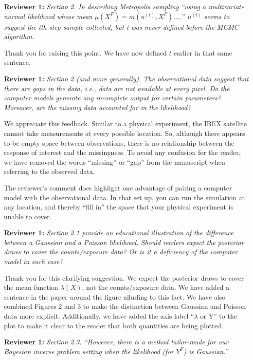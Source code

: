 \documentclass[12pt]{article}
\begin{document}
\bigskip
\noindent
\textbf{Reviewer 1:} \textit{Section 2. In describing Metropolis sampling
``using a multivariate normal likelihood whose mean} $\mu(X^F) = m(u^{(t)},
X^F) \ldots,$'' $u^{(t)}$ \textit{seems to suggest the tth step sample collected,
but t was never defined before the MCMC algorithm.}

\bigskip
\noindent
Thank you for raising this point. We have now defined $t$ earlier in that same
sentence.

\bigskip
\noindent
\textbf{Reviewer 1:} \textit{Section 2 (and more generally). The observational
data suggest that there are gaps in the data, i.e., data are not available at
every pixel. Do the computer models generate any incomplete output for certain
parameters? Moreover, are the missing data accounted for in the likelihood?}

\bigskip
\noindent
We appreciate this feedback. Similar to a physical experiment, the IBEX
satellite cannot take measurements at every possible location. So, although
there appears to be empty space between observations, there is no relationship
between the response of interest and the missingness. To avoid any confusion
for the reader, we have removed the words ``missing'' or ``gap'' from the
manuscript when referring to the observed data.

\bigskip
\noindent
The reviewer's comment does highlight one advantage of pairing a computer
model with the observational data. In that set up, you can run the simulation
at any location, and thereby ``fill in'' the space that your physical
experiment is unable to cover.

\bigskip
\noindent
\textbf{Reviewer 1:} \textit{Section 2.1 provide an educational illustration
of the difference between a Gaussian and a Poisson likelihood. Should readers
expect the posterior draws to cover the counts/exposure data? Or is it a
deficiency of the computer model in such case?}

\bigskip
\noindent
Thank you for this clarifying suggestion. We expect the posterior draws to
cover the mean function $\lambda(X)$, not the counts/exposure data. We have
added a sentence in the paper around the figure alluding to this fact. We have
also combined Figures 2 and 3 to make the distinction between Gaussian and
Poisson data more explicit. Additionally, we have added the axis label
``$\lambda$ or Y'' to the plot to make it clear to the reader that both
quantities are being plotted.

\bigskip
\noindent
\textbf{Reviewer 1:} \textit{Section 2.3. ``However, there is a method
tailor-made for our Bayesian inverse problem setting when the likelihood (for
\(Y^F\)) is Gaussian.''}
\end{document}
